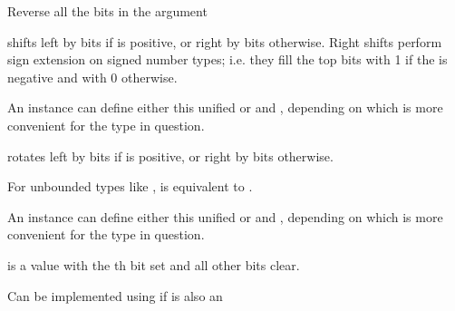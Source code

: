 \begin{haddockdesc}
{\begin{haddockdesc}
\item[\begin{tabular}{@{}l}
complement :: a -> a
\end{tabular}]
{\haddockbegindoc
Reverse all the bits in the argument \par}
\end{haddockdesc}
\begin{haddockdesc}
\item[\begin{tabular}{@{}l}
shift :: a -> Int -> a
\end{tabular}]
{\haddockbegindoc
{} shifts  left by  bits if  is positive,
        or right by  bits otherwise.
        Right shifts perform sign extension on signed number types;
        i.e. they fill the top bits with 1 if the  is negative
        and with 0 otherwise.\par
An instance can define either this unified  or  and
        , depending on which is more convenient for the type in
        question. \par}
\end{haddockdesc}
\begin{haddockdesc}
\item[\begin{tabular}{@{}l}
rotate :: a -> Int -> a
\end{tabular}]
{\haddockbegindoc
{} rotates  left by  bits if  is positive,
        or right by  bits otherwise.\par
For unbounded types like ,  is equivalent to .\par
An instance can define either this unified  or  and
        , depending on which is more convenient for the type in
        question. \par}
\end{haddockdesc}
\begin{haddockdesc}
\item[\begin{tabular}{@{}l}
bit :: Int -> a
\end{tabular}]
{\haddockbegindoc
{} is a value with the th bit set and all other bits clear.\par
Can be implemented using  if  is also an
}
\end{haddockdesc}}
\end{haddockdesc}
